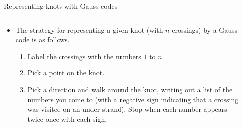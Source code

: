 \documentclass{beamer}
\begin{document}
\begin{frame}{Representing knots with Gauss codes}
    \begin{columns}
        \begin{column}{0.65\textwidth}
            \begin{itemize}
            \item The strategy for representing a given knot (with $n$ crossings) by a Gauss code is as follows.
            \begin{enumerate}
                    \item Label the crossings with the numbers $1$ to $n$.
                    \item Pick a point on the knot.
                    \item Pick a direction and walk around the knot, writing out a list of the numbers you come to (with a negative sign indicating that a crossing was visited on an under strand). Stop when each number appears twice once with each sign.
            \end{enumerate}
            \end{itemize}
            \begin{center}
	        \end{center}
        \end{column}
        \begin{column}{0.25\textwidth}
\end{column}
\end{columns}
\end{frame}
\end{document}
